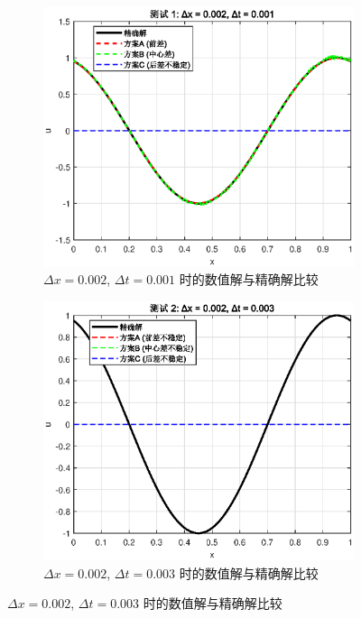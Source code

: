 \documentclass[12pt]{article}
\begin{document}
            \begin{figure}[H]
                \centering
                \begin{subfigure}[b]{0.48\textwidth}
                    \centering
                    \includegraphics[width=\textwidth]{fig/result_0001.eps}
                    \caption{$\Delta x = 0.002$, $\Delta t = 0.001$ 时的数值解与精确解比较}
                \end{subfigure}
                \hfill
                \begin{subfigure}[b]{0.48\textwidth}
                    \centering
                    \includegraphics[width=\textwidth]{fig/result_0003.eps}
                    \caption{$\Delta x = 0.002$, $\Delta t = 0.003$ 时的数值解与精确解比较}
                \end{subfigure}
            \end{figure}
\end{document}
